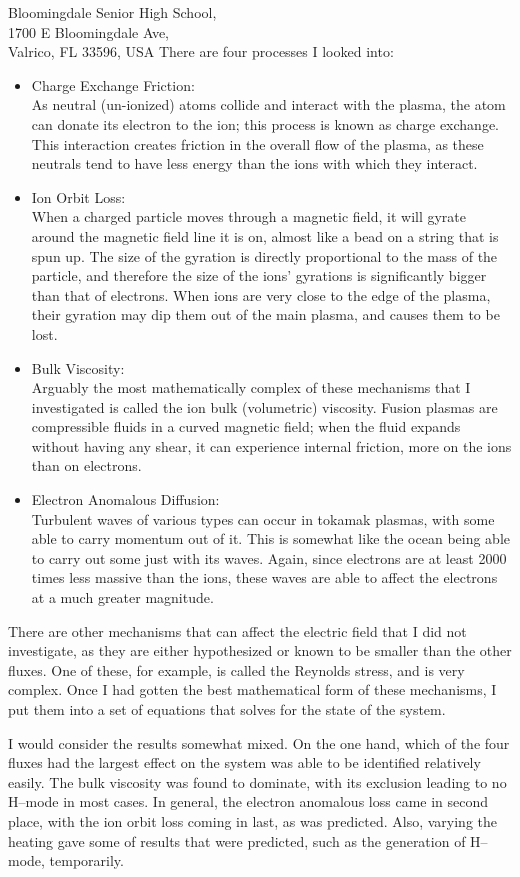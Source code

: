 \documentclass[12pt,a4paper]{letter}
\begin{document}
\begin{letter}{
	Bloomingdale Senior High School,\\
	1700 E Bloomingdale Ave,\\
	Valrico, FL 33596, USA
}
There are four processes I looked into:
\begin{itemize}
	\item Charge Exchange Friction: \\
As neutral (un-ionized) atoms collide and interact with the plasma, the atom can donate its electron to the ion; this process is known as charge exchange.
This interaction creates friction in the overall flow of the plasma, as these neutrals tend to have less energy than the ions with which they interact.
	\item Ion Orbit Loss: \\
When a charged particle moves through a magnetic field, it will gyrate around the magnetic field line it is on, almost like a bead on a string that is spun up.
The size of the gyration is directly proportional to the mass of the particle, and therefore the size of the ions' gyrations is significantly bigger than that of electrons.
When ions are very close to the edge of the plasma, their gyration may dip them out of the main plasma, and causes them to be lost.
	\item Bulk Viscosity: \\
Arguably the most mathematically complex of these mechanisms that I investigated is called the ion bulk (volumetric) viscosity.
Fusion plasmas are compressible fluids in a curved magnetic field; when the fluid expands without having any shear, it can experience internal friction, more on the ions than on electrons.
	\item Electron Anomalous Diffusion: \\
Turbulent waves of various types can occur in tokamak plasmas, with some able to carry momentum out of it.
This is somewhat like the ocean being able to carry out some just with its waves.
Again, since electrons are at least 2000 times less massive than the ions, these waves are able to affect the electrons at a much greater magnitude.
\end{itemize}

There are other mechanisms that can affect the electric field that I did not investigate, as they are either hypothesized or known to be smaller than the other fluxes.
One of these, for example, is called the Reynolds stress, and is very complex.
Once I had gotten the best mathematical form of these mechanisms, I put them into a set of equations that solves for the state of the system.

I would consider the results somewhat mixed.
On the one hand, which of the four fluxes had the largest effect on the system was able to be identified relatively easily.
The bulk viscosity was found to dominate, with its exclusion leading to no H--mode in most cases.
In general, the electron anomalous loss came in second place, with the ion orbit loss coming in last, as was predicted.
Also, varying the heating gave some of results that were predicted, such as the generation of H--mode, temporarily.


\end{letter}
\end{document}
